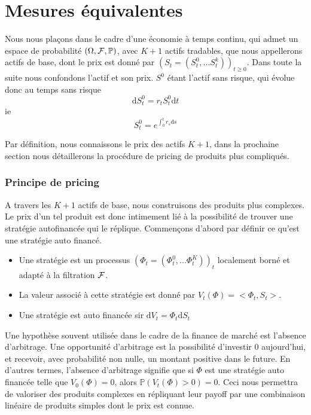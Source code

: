 \section{Mesures équivalentes}

Nous nous plaçons dans le cadre d'une économie à temps continu, qui admet un espace de probabilité $(\Omega, \cal{F}, \mathbb{P})$, avec $K+1$ actifs tradables, que nous appellerons actifs de base, dont le prix est donné par $(S_t = (S^0_t, ...S^k_t))_{t \geq 0}$. Dans toute la suite nous confondons l'actif et son prix.
$S^0$ étant l'actif sans risque, qui évolue donc au temps sans risque $$\mathrm{d}S^0_t = r_t S^0_t \mathrm{d}t$$
ie $$S^0_t = e^{\int_0^t r_s \mathrm{d}s}$$

Par définition, nous connaissons le prix des actifs $K+1$, dans la prochaine section nous détaillerons la procédure de pricing de produits plus compliqués.

\subsubsection{Principe de pricing}
A travers les $K+1$ actifs de base, nous construisons des produits plus complexes. 
Le prix d'un tel produit est donc intimement lié à la possibilité de trouver une stratégie autofinancée qui le réplique.
Commençons d'abord par définir ce qu'est une stratégie auto financé.

\begin{defn}
  \begin{itemize}
  \item Une stratégie est un processus $(\Phi_t = (\Phi^0_t, ... \Phi^K_t))_t$ localement borné et adapté à la filtration $\cal{F}$.
  \item La valeur associé à cette stratégie est donné par $V_t(\Phi) = <\Phi_t, S_t>$.
  \item Une stratégie est auto financée sir $\mathrm{d}V_t = \Phi_t \mathrm{d}S_t$
  \end{itemize}
\end{defn}

Une hypothèse souvent utilisée dans le cadre de la finance de marché est l'absence d'arbitrage. Une opportunité d'arbitrage est la possibilité d'investir 0 aujourd'hui, et recevoir, avec probabilité non nulle, un montant positive dans le future. En d'autres termes, l'absence d'arbitrage signifie que si $\Phi$ est une stratégie auto financée telle que $V_0(\Phi) = 0$, alors $\mathbb{P} ( V_t(\Phi) > 0 ) = 0$. Ceci nous permettra de valoriser des produits complexes en répliquant leur payoff par une combinaison linéaire de produits simples dont le prix est connue.


